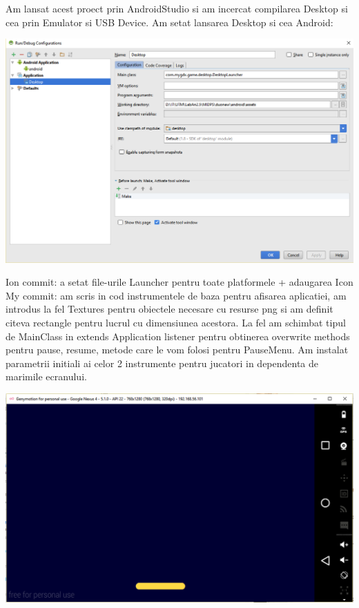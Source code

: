 Am lansat acest proect prin AndroidStudio si am incercat compilarea Desktop si cea prin Emulator si USB Device.
Am setat lansarea Desktop si cea Android:
\begin{center}
\includegraphics[width=0.7\linewidth]{screenshot004}
\end{center}
\newline 
Ion commit: a setat file-urile Launcher pentru toate platformele + adaugarea Icon
\newline \newline 
My commit: am scris in cod instrumentele de baza pentru afisarea aplicatiei, am introdus la fel Textures pentru obiectele necesare cu resurse png si am definit citeva rectangle pentru lucrul cu dimensiunea acestora. La fel am schimbat tipul de MainClass in extends Application listener pentru obtinerea overwrite methods pentru pause, resume, metode care le vom folosi pentru PauseMenu. Am instalat parametrii initiali ai celor 2 instrumente pentru jucatori in dependenta de marimile ecranului.
\begin{center}
\includegraphics[width=0.7\linewidth]{screenshot005}
\end{center}

